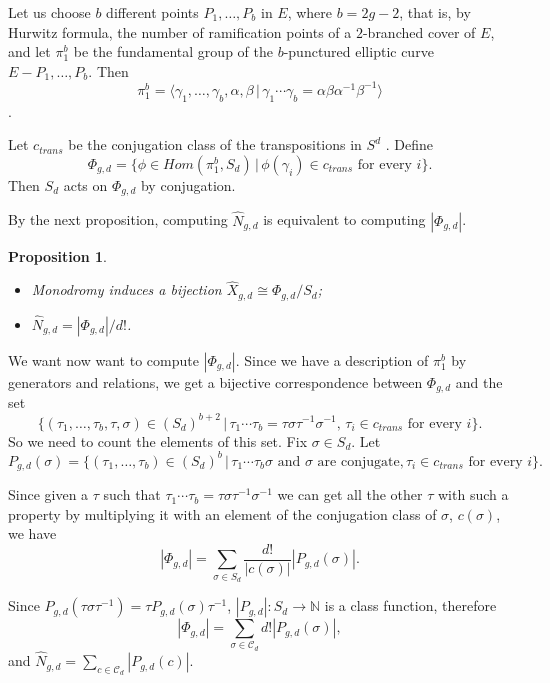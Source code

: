 \documentclass{article}
\numberwithin{equation}{section}
\numberwithin{figure}{section}
\theoremstyle{plain}
\newtheorem{proposition}[theorem]{Proposition}
\theoremstyle{definition}
\numberwithin{equation}{section}
\newtheorem[S, bodystyle=\normalfont\noindent]{defiS}{Definition}[section]
\begin{document}
Let us choose $b$ different points $P_1,\ldots, P_b$ in $E$, where $b=2g-2$, that is, by Hurwitz formula, the number of ramification points of a $2$-branched cover of $E$, and let $\pi_1^b$ be the fundamental group of the $b$-punctured elliptic curve $E-{P_1,\ldots,P_b}$. Then $$\pi_1^b=\langle \gamma_1,\ldots,\gamma_b,\alpha,\beta \, |\,  \gamma_1\cdots \gamma_b=\alpha\beta\alpha^{-1}\beta^{-1}\rangle$$.

Let $c_{trans}$ be the conjugation class of the transpositions in $S^d$ . Define $$\Phi_{g,d}=\{\phi\in Hom(\pi_1^b,S_d)\, |\, \phi(\gamma_i)\in c_{trans}\text{ for every }i\}.$$ Then $S_d$ acts on $\Phi_{g,d}$ by conjugation.

By the next proposition, computing $\hat{N}_{g,d}$ is equivalent to computing $|\Phi_{g,d}|$. 

\begin{proposition}
\begin{itemize}
\item[a.] Monodromy induces a bijection $\hat{X}_{g,d}\cong \Phi_{g,d}/S_d$;
\item[b.] $\hat{N}_{g,d}=|\Phi_{g,d}|/d!$.
\end{itemize}
\end{proposition}



We want now want to compute $|\Phi_{g,d}|$. Since we have a description of $\pi_1^b$ by generators and relations, we get a bijective correspondence between $\Phi_{g,d}$ and the set $$\{(\tau_1,\ldots,\tau_b,\tau,\sigma)\in (S_d)^{b+2}\, |\, \tau_1\cdots \tau_b=\tau\sigma\tau^{-1}\sigma^{-1},\, \tau_i\in c_{trans}\text{ for every }i\}.$$ 
So we need to count the elements of this set. Fix $\sigma\in S_d$. Let $$P_{g,d}(\sigma)=\{(\tau_1,\ldots,\tau_b)\in (S_d)^b\, |\, \tau_1\cdots \tau_b\sigma\text{ and } \sigma \text{ are conjugate}, \tau_i\in {c_{trans}}\text{ for every }i\}.$$ 

Since given a $\tau$ such that  $\tau_1\cdots \tau_b=\tau\sigma\tau^{-1}\sigma^{-1}$ we can get all the other $\tau$ with such a property by multiplying it with an element of the conjugation class of $\sigma$, $c(\sigma)$, we have $$|\Phi_{g,d}|=\sum_{{\sigma\in{S_d}}}\frac{d!}{|c(\sigma)|}|P_{g,d}(\sigma)|.$$ 

Since $P_{g,d}(\tau\sigma\tau^{-1})=\tau P_{g,d}(\sigma)\tau^{-1}$, $|P_{g,d}|:S_d \rightarrow \mathbb{N}$ is a class function, therefore $$|\Phi_{g,d}|=\sum_{{\sigma\in{\mathcal{C}_d}}} d!|P_{g,d}(\sigma)|,$$ and $\hat{N}_{g,d}=\sum_{c\in{\mathcal{C}_d}} |P_{g,d}(c)|$. 
\end{document}
